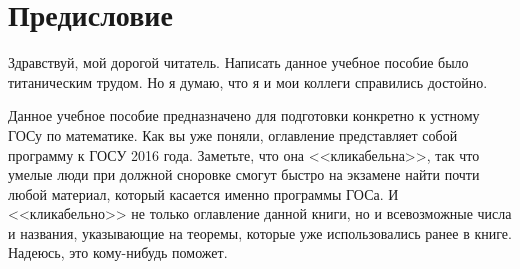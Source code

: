 \chapter{Предисловие}
Здравствуй, мой дорогой читатель. Написать данное учебное пособие было титаническим трудом. Но я думаю, что я и мои коллеги справились достойно.

Данное учебное пособие предназначено для подготовки конкретно к устному ГОСу по математике. Как вы уже поняли, оглавление представляет собой программу к ГОСУ 2016 года. Заметьте, что она <<кликабельна>>, так что умелые люди при должной сноровке смогут быстро на экзамене найти почти любой материал, который касается именно программы ГОСа. И <<кликабельно>> не только оглавление данной книги, но и всевозможные числа и названия, указывающие на теоремы, которые уже использовались ранее в книге. Надеюсь, это кому-нибудь поможет. 

